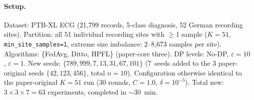 \documentclass[conference]{IEEEtran}
\begin{document}
\paragraph{Setup.} Dataset: PTB-XL ECG (21{,}799 records, 5-class diagnosis, 52 German recording sites). Partition: all 51 individual recording sites with $\geq$1 sample ($K{=}51$, \texttt{min\_site\_samples=1}, extreme size imbalance: 2--8{,}673 samples per site). Algorithms: \{FedAvg, Ditto, HPFL\} (paper-core three). DP levels: No-DP, $\varepsilon{=}10$, $\varepsilon{=}1$. New seeds: $\{789, 999, 7, 13, 31, 67, 101\}$ (7~seeds added to the 3 paper-original seeds $\{42, 123, 456\}$, total $n{=}10$). Configuration otherwise identical to the paper-original $K{=}51$ run (30 rounds, $C{=}1.0$, $\delta{=}10^{-5}$). Total new: $3\times3\times7 = 63$ experiments, completed in $\sim$30~min.

\begin{table}[ht]
\centering
\caption{PTB-XL $K{=}51$ multi-seed extension (K8). Accuracy over the 7~new seeds with 95\% bootstrap CI; the paper-original column reports the $n{=}3$ value of §IV.B Key-finding bullet~3 and Table~\ref{tab:s-prerebuttal-8-paper-vs-multi-anchor} (below). The paper-original $n{=}3$ value is the canonical claim of the main paper v12.}
\label{tab:s-prerebuttal-8-multiseed}
\small
{}
\end{table}
\end{document}
